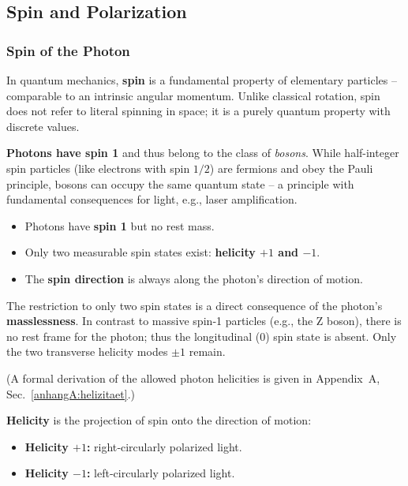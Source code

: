 \newpage
\noindent
\subsection{Spin and Polarization}

\subsubsection{Spin of the Photon}

In quantum mechanics, \textbf{spin} is a fundamental property of elementary particles – comparable to an intrinsic angular momentum. Unlike classical rotation, spin does not refer to literal spinning in space; it is a purely quantum property with discrete values.

\vspace{0.5em}
\textbf{Photons have spin 1} and thus belong to the class of \textit{bosons}. While half-integer spin particles (like electrons with spin $1/2$) are fermions and obey the Pauli principle, bosons can occupy the same quantum state – a principle with fundamental consequences for light, e.g., laser amplification.
\vspace{1em}
\begin{tcolorbox}[physikbox, title=Properties of Photon Spin]
	\label{box:Eigenschaften des}
	\begin{itemize}
		\item Photons have \textbf{spin 1} but no rest mass.
		\item Only two measurable spin states exist: \textbf{helicity $+1$ and $-1$}.
		\item The \textbf{spin direction} is always along the photon’s direction of motion.
	\end{itemize}
\end{tcolorbox}
\vspace{1em}
The restriction to only two spin states is a direct consequence of the photon’s \textbf{masslessness}. In contrast to massive spin‑1 particles (e.g., the Z boson), there is no rest frame for the photon; thus the longitudinal ($0$) spin state is absent. Only the two transverse helicity modes $\pm 1$ remain.

(A formal derivation of the allowed photon helicities is given in Appendix~A, Sec.~\ref{anhangA:helizitaet}.)

\newpage
\noindent
\textbf{Helicity} is the projection of spin onto the direction of motion:
\begin{itemize}
	\item \textbf{Helicity $+1$:} right‑circularly polarized light.
	\item \textbf{Helicity $-1$:} left‑circularly polarized light.
\end{itemize}

